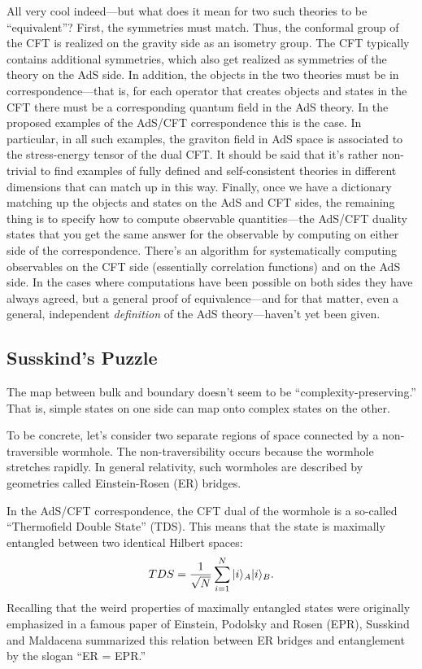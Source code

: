 \documentclass[11pt]{report}
\theoremstyle{plain}
\theoremstyle{definition}
\renewcommand{\ket}[1]{|#1\rangle}
\begin{document}
All very cool indeed---but what does it mean for two such theories to be ``equivalent''?  First, the symmetries must match.  Thus, the conformal group of the CFT is realized on the gravity side as an isometry group.   The CFT typically contains additional symmetries, which also get realized as symmetries of the theory on the AdS side.  In addition, the objects in the two theories must be in correspondence---that is, for each operator that creates objects and states in the CFT there must be a corresponding quantum field in the AdS theory.  In the proposed examples of the AdS/CFT correspondence this is the case.   In particular, in all such examples, the graviton field in AdS space is associated to the stress-energy tensor of the dual CFT.   It should be said that it's rather non-trivial to find examples of fully defined and self-consistent theories in different dimensions that can match up in this way.    Finally, once we have a dictionary matching up the objects and states on the AdS and CFT sides, the remaining thing is to specify how to compute observable quantities---the AdS/CFT duality states that you get the same answer for the observable by computing on either side of the correspondence.  There's an algorithm for systematically computing observables on the CFT side (essentially correlation functions) and on the AdS side.  In the cases where computations have been possible on both sides they have always agreed, but a general proof of equivalence---and for that matter, even a general, independent {\em definition} of the AdS theory---haven't yet been given.


\subsection{Susskind's Puzzle}

The map between bulk and boundary doesn't seem to be ``complexity-preserving.''   That is, simple states on one side can map onto complex states on the other.

 To be concrete, let's consider two separate regions of space connected by a non-traversible wormhole.  The non-traversibility occurs because the wormhole stretches rapidly.   In general relativity, such wormholes are described by geometries called Einstein-Rosen (ER) bridges.

In the AdS/CFT correspondence, the CFT dual of the wormhole is a so-called ``Thermofield Double State'' (TDS).   This means that the state is maximally entangled between two identical Hilbert spaces:
\begin{equation}
TDS = {1 \over \sqrt{N}} \sum_{i=1}^N \ket{i}_A \ket{i}_B.
\end{equation}
Recalling that the weird properties of maximally entangled states were originally emphasized in a famous paper of Einstein, Podolsky and Rosen (EPR), Susskind and Maldacena \cite{MS13} summarized this relation between ER bridges and entanglement by the slogan ``ER = EPR.''
\end{document}
